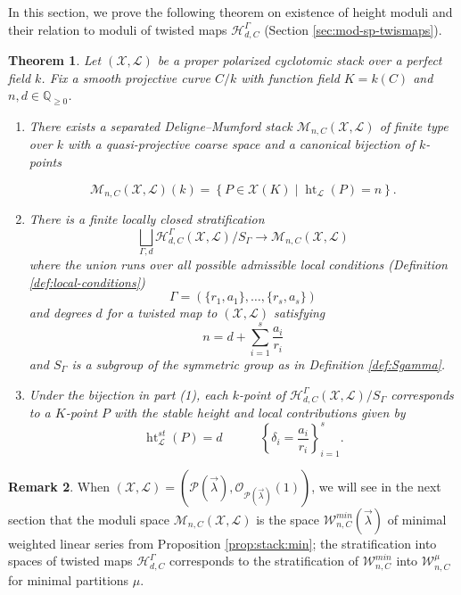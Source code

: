 \documentclass[a4paper,12pt]{amsart}
\newtheorem{thm}{Theorem}[section]
\theoremstyle{definition}
\newtheorem{rmk}[thm]{Remark}
\newcommand{\cX}{\mathcal{X}}
\newcommand{\cO}{\mathcal{O}}
\newcommand{\cL}{\mathcal{L}}
\newcommand{\cW}{\mathcal{W}}
\newcommand{\cH}{\mathcal{H}}
\newcommand{\cM}{\mathcal{M}}
\DeclareMathOperator{\height}{ht}
\newcommand{\Pcv}{\mathcal{P}(\vec{\lambda})}
\newcommand{\lambdavec}{{\vec{\lambda}}}
\begin{document}
	
	In this section, we prove the following theorem on existence of height moduli and their relation to moduli of twisted maps $\cH_{d,C}^\Gamma$ (Section \ref{sec:mod-sp-twismaps}).
	
	\begin{thm}\label{thm:height:moduli_body} Let $(\cX, \cL)$ be a proper polarized cyclotomic stack over a perfect field $k$. Fix a smooth projective curve $C/k$ with function field $K = k(C)$ and $n,d \in \mathbb{Q}_{\ge 0}$.
		
		
		\begin{enumerate} 
			\item There exists a separated Deligne--Mumford stack $\cM_{n,C}(\cX,\cL)$ of finite type over $k$ with a quasi-projective coarse space and a canonical bijection of $k$-points
			
			$$
			\cM_{n,C}(\cX, \cL)(k) = \left\{ P \in \cX(K) \mid \height_{\cL}(P) = n \right \}.
			$$
			\item There is a finite locally closed stratification 
			$$
			\bigsqcup_{\Gamma,d} 
			\cH^\Gamma_{d,C}(\cX, \cL)/S_\Gamma\to \cM_{n,C}(\cX, \cL)
			$$
			where the union runs over all possible admissible local conditions (Definition \ref{def:local-conditions})
			$$\Gamma = \left(\{r_1, a_1\}, \ldots, \{r_s, a_s\}\right)$$ and degrees $d$ for a twisted map to $(\cX, \cL)$ satisfying
			$$
			n = d + \sum_{i = 1}^s \frac{a_i}{r_i} 
			$$
			and $S_\Gamma$ is a subgroup of the symmetric group as in Definition \ref{def:Sgamma}. 
			
			\item Under the bijection in part (1), each $k$-point of $\cH_{d,C}^\Gamma(\cX, \cL)/S_\Gamma$ corresponds to a $K$-point $P$ with the stable height and local contributions given by
			$$
			\height^{st}_{\cL}(P) = d \quad \quad \quad \left\{\delta_i = \frac{a_i}{r_i}\right\}_{i = 1}^s. 
			$$
		\end{enumerate}
	\end{thm}
	
	
	\begin{rmk} When $(\cX,\cL) = \left(\Pcv, \cO_{\Pcv}(1)\right)$, we will see in the next section that the moduli space $\cM_{n,C}(\cX,\cL)$ is the space $\cW_{n,C}^{min}(\lambdavec)$ of minimal weighted linear series from Proposition \ref{prop:stack:min}; the stratification into spaces of twisted maps $\cH^\Gamma_{d,C}$ corresponds to the stratification of $\cW^{min}_{n,C}$ into $\cW^\mu_{n,C}$ for minimal partitions $\mu$. 
	\end{rmk}
	
\end{document}
